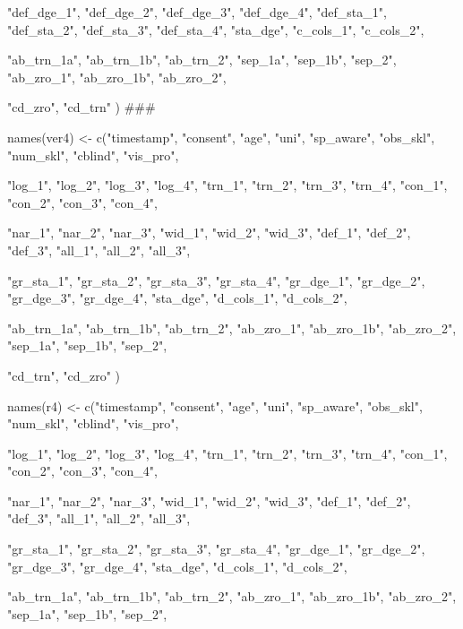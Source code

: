 \documentclass{article}
\begin{document}
                 "def_dge_1", "def_dge_2", "def_dge_3", "def_dge_4",
                 "def_sta_1", "def_sta_2", "def_sta_3", "def_sta_4", 
                 "sta_dge",
                 "c_cols_1", "c_cols_2", 
  
                 "ab_trn_1a", "ab_trn_1b", "ab_trn_2", 
                 "sep_1a", "sep_1b", "sep_2",
                 "ab_zro_1", "ab_zro_1b", "ab_zro_2",                
  
                 "cd_zro",
                 "cd_trn"
                 )
###

names(ver4) <- c("timestamp", "consent", "age", "uni", "sp_aware", "obs_skl", "num_skl", "cblind", "vis_pro",
                 
                 "log_1", "log_2", "log_3", "log_4",
                 "trn_1", "trn_2", "trn_3", "trn_4",
                 "con_1", "con_2", "con_3", "con_4", 
  
                 "nar_1", "nar_2", "nar_3", 
                 "wid_1", "wid_2", "wid_3",
                 "def_1", "def_2", "def_3", 
                 "all_1", "all_2", "all_3",
  
                 "gr_sta_1", "gr_sta_2", "gr_sta_3", "gr_sta_4",
                 "gr_dge_1", "gr_dge_2", "gr_dge_3", "gr_dge_4",  
                 "sta_dge",
                 "d_cols_1", "d_cols_2", 
  
                 "ab_trn_1a", "ab_trn_1b", "ab_trn_2", 
                 "ab_zro_1", "ab_zro_1b", "ab_zro_2",
                 "sep_1a", "sep_1b", "sep_2",

                 "cd_trn",
                 "cd_zro"
                 )

names(r4) <- c("timestamp", "consent", "age", "uni", "sp_aware", "obs_skl", "num_skl", "cblind", "vis_pro",
                 
                 "log_1", "log_2", "log_3", "log_4",
                 "trn_1", "trn_2", "trn_3", "trn_4",
                 "con_1", "con_2", "con_3", "con_4", 
  
                 "nar_1", "nar_2", "nar_3", 
                 "wid_1", "wid_2", "wid_3",
                 "def_1", "def_2", "def_3", 
                 "all_1", "all_2", "all_3",
  
                 "gr_sta_1", "gr_sta_2", "gr_sta_3", "gr_sta_4",
                 "gr_dge_1", "gr_dge_2", "gr_dge_3", "gr_dge_4",  
                 "sta_dge",
                 "d_cols_1", "d_cols_2", 
  
                 "ab_trn_1a", "ab_trn_1b", "ab_trn_2", 
                 "ab_zro_1", "ab_zro_1b", "ab_zro_2",
                 "sep_1a", "sep_1b", "sep_2",
\end{document}

